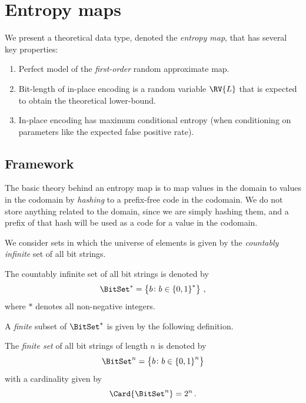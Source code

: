 \documentclass[ ../main.tex]{subfiles}
\begin{document}
\section{Entropy maps}
\label{sec:entropy-maps}

We present a theoretical data type, denoted the \emph{entropy map}, that has several key properties:
\begin{enumerate}
\item Perfect model of the \emph{first-order} random approximate map.
\item Bit-length of in-place encoding is a random variable $\RV{L}$ that is expected to obtain the theoretical lower-bound.
\item In-place encoding has maximum conditional entropy (when conditioning on parameters like the expected false positive rate).
\end{enumerate}

\subsection{Framework}

The basic theory behind an entropy map is to map values in the domain to
values in the codomain by \emph{hashing} to a prefix-free code in the
codomain. We do not store anything related to the domain, since we are
simply hashing them, and a prefix of that hash will be used as a code
for a value in the codomain.

We consider sets in which the universe of elements is given by the \emph{countably infinite} set of all bit strings.
\begin{definition}
The countably infinite set of all bit strings is denoted by
\begin{equation}
    \BitSet^* = \left\{b \colon b \in \left\{0,1\right\}^*\right\}\,,
\end{equation}
where $*$ denotes all non-negative integers.
\end{definition}
A \emph{finite} subset of $\BitSet^*$ is given by the following definition.
\begin{definition}
The \emph{finite set} of all bit strings of length $n$ is denoted by
\begin{equation}
    \BitSet^n = \left\{b \colon b \in \left\{0,1\right\}^n\right\}
\end{equation}
with a cardinality given by
\begin{equation}
    \Card{\BitSet^n} = 2^n\,.
\end{equation}
\end{definition}
\end{document}
